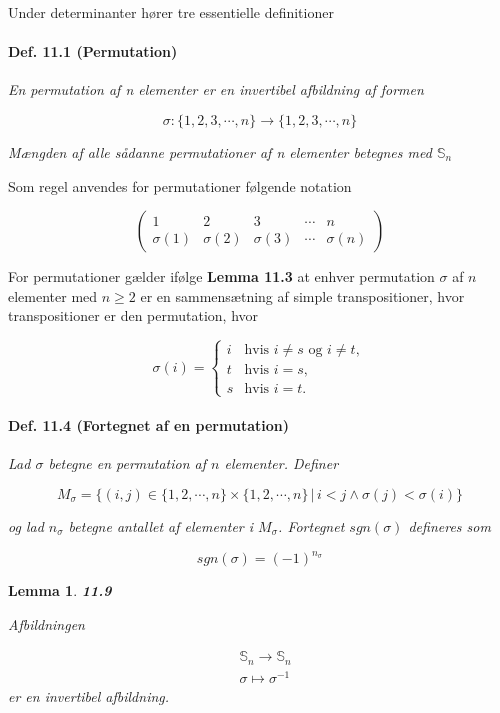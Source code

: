 \documentclass[paper=a4, fontsize=11pt]{scrartcl} %
\newtheorem*{lemma}{Lemma}
\newenvironment{cstmlemma}[1]{\begin{lemma} {\normalfont\textbf{#1}}}{\end{lemma}}
\begin{document}
	
	Under determinanter hører tre essentielle definitioner
	
	\paragraph{Def. 11.1 (Permutation)} \textit{En permutation af n elementer er en invertibel afbildning af formen}
	
	\[\sigma : \{1,2,3,\cdots,n\} \rightarrow \{1,2,3,\cdots,n\}\]
	
	\textit{Mængden af alle sådanne permutationer af n elementer betegnes med $\mathbb{S}_n$}
	
	
	Som regel anvendes for permutationer følgende notation
	
	\[\begin{pmatrix}
	1 & 2 & 3 & \cdots & n\\
	\sigma (1) & \sigma (2) & \sigma (3) & \cdots & \sigma (n)
	\end{pmatrix}\]
	
	For permutationer gælder ifølge \textbf{Lemma 11.3} at enhver permutation $\sigma$ af $n$ elementer med $n \geq 2$ er en sammensætning af simple transpositioner, hvor transpositioner er den permutation, hvor 
	
	\[\sigma (i) = \left \{
	\begin{array}{ll}
	i & \mbox{hvis } i \not = s \mbox{ og } i \not = t,\\
	t & \mbox{hvis } i = s, \\
	s & \mbox{hvis } i = t.
	\end{array}
	\right.\]
	
	\paragraph{Def. 11.4 (Fortegnet af en permutation)} \textit{Lad $\sigma$ betegne en permutation af $n$ elementer. Definer}
	
	\[M_{\sigma} = \{(i,j) \in \{1,2,\cdots,n\} \times \{1,2,\cdots,n\} \,|\, i < j \land \sigma (j) < \sigma (i)\}\]
	
	\textit{og lad $n_{\sigma}$ betegne antallet af elementer i $M_{\sigma}$. Fortegnet $sgn(\sigma)$ defineres som}
	
	\[sgn(\sigma) = (-1)^{n_{\sigma}}\]
	
	\begin{cstmlemma}{11.9} 
		
		Afbildningen
		
		\begin{align*}
			&\mathbb{S}_n \rightarrow \mathbb{S}_n\\
			&\sigma \mapsto \sigma^{-1}
		\end{align*}
		er en invertibel afbildning.
	\end{cstmlemma}
	
\end{document}
